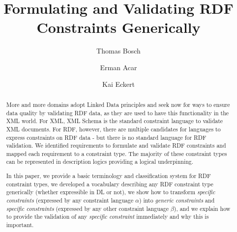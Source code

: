 \documentclass{llncs}
\newcommand{\ms}[1]{\texttt{#1}}
\begin{document}
%
%
\title{Formulating and Validating RDF Constraints Generically}
%
%
\author{Thomas Bosch \and Erman Acar \and Kai Eckert}
%
%

\maketitle              %

\begin{abstract}

More and more domains adopt Linked Data principles
and seek now for ways to ensure data quality by validating RDF data, as they are used to have this functionality in the XML world.
For XML, XML Schema is the standard constraint language to validate XML documents.
For RDF, however, there are multiple candidates for languages to express constraints on RDF data - but there is no standard language for RDF validation.
We identified requirements to formulate and validate RDF constraints and mapped each requirement to a constraint type.
The majority of these constraint types can be represented in description logics providing a logical underpinning.

In this paper, we provide a basic terminology and classification system for RDF constraint types,
we developed a vocabulary describing any RDF constraint type generically (whether expressible in DL or not),
we show how to transform \emph{specific constraints} (expressed by any constraint language \ms{$\alpha$}) into \emph{generic constraints} and \emph{specific constraints} (expressed by any other constraint language \ms{$\beta$}), and
we explain how to provide the validation of any \emph{specific constraint} immediately and why this is important. 

\end{abstract}
%
\end{document}
